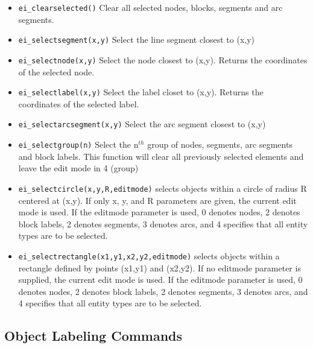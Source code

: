 \begin{itemize}
\item {\tt ei\_clearselected()} Clear all selected nodes, blocks, segments and arc
segments.

\item {\tt ei\_selectsegment(x,y)} Select the line segment closest to (x,y)

\item {\tt ei\_selectnode(x,y)} Select the node closest to (x,y).
Returns the coordinates of the selected node.

\item {\tt ei\_selectlabel(x,y)} Select the label closet to (x,y).
Returns the coordinates of the selected label.

\item {\tt ei\_selectarcsegment(x,y)} Select the arc segment closest to (x,y)

\item {\tt ei\_selectgroup(n)} Select the n$^{th}$ group of nodes, segments, arc
segments and block labels. This function will clear all previously selected
elements and leave the edit mode in 4 (group)

\item{\tt ei\_selectcircle(x,y,R,editmode)} selects objects within a circle of radius
R centered at (x,y).  If only x, y, and R parameters are given, the current
edit mode is used.  If the editmode parameter is used, 0 denotes nodes, 2
denotes block labels, 2 denotes segments, 3 denotes arcs, and 4 specifies
that all entity types are to be selected.

\item{\tt ei\_selectrectangle(x1,y1,x2,y2,editmode)} selects objects within a rectangle
defined by points (x1,y1) and (x2,y2). If no editmode parameter is supplied,
the current edit mode is used.  If the editmode parameter is used, 0 denotes
nodes, 2 denotes block labels, 2 denotes segments, 3 denotes arcs, and 4 
specifies that all entity types are to be selected.
\end{itemize}


\subsection{Object Labeling Commands}


